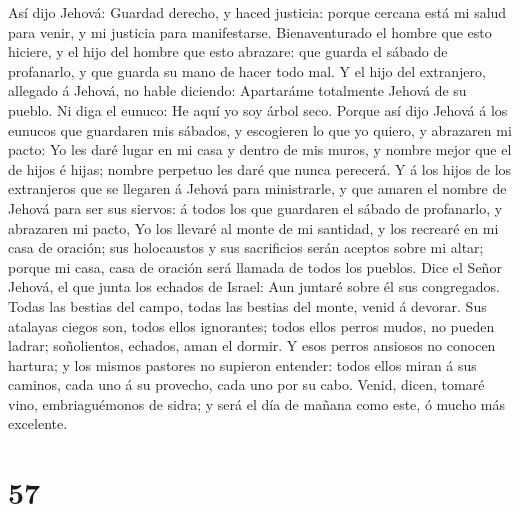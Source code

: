  Así dijo Jehová: Guardad derecho, y haced justicia:
porque cercana está mi salud para venir, y mi justicia para
manifestarse.  Bienaventurado el hombre que esto hiciere,
y el hijo del hombre que esto abrazare: que guarda el sábado de
profanarlo, y que guarda su mano de hacer todo mal.  Y el
hijo del extranjero, allegado á Jehová, no hable diciendo: Apartaráme
totalmente Jehová de su pueblo. Ni diga el eunuco: He aquí yo soy árbol
seco.  Porque así dijo Jehová á los eunucos que guardaren
mis sábados, y escogieren lo que yo quiero, y abrazaren mi pacto:
 Yo les daré lugar en mi casa y dentro de mis muros, y
nombre mejor que el de hijos é hijas; nombre perpetuo les daré que nunca
perecerá.  Y á los hijos de los extranjeros que se
llegaren á Jehová para ministrarle, y que amaren el nombre de Jehová
para ser sus siervos: á todos los que guardaren el sábado de profanarlo,
y abrazaren mi pacto,  Yo los llevaré al monte de mi
santidad, y los recrearé en mi casa de oración; sus holocaustos y sus
sacrificios serán aceptos sobre mi altar; porque mi casa, casa de
oración será llamada de todos los pueblos.  Dice el Señor
Jehová, el que junta los echados de Israel: Aun juntaré sobre él sus
congregados.  Todas las bestias del campo, todas las
bestias del monte, venid á devorar.  Sus atalayas ciegos
son, todos ellos ignorantes; todos ellos perros mudos, no pueden ladrar;
soñolientos, echados, aman el dormir.  Y esos perros
ansiosos no conocen hartura; y los mismos pastores no supieron entender:
todos ellos miran á sus caminos, cada uno á su provecho, cada uno por su
cabo.  Venid, dicen, tomaré vino, embriaguémonos de
sidra; y será el día de mañana como este, ó mucho más excelente.

\hypertarget{section-56}{%
\section{57}\label{section-56}}

